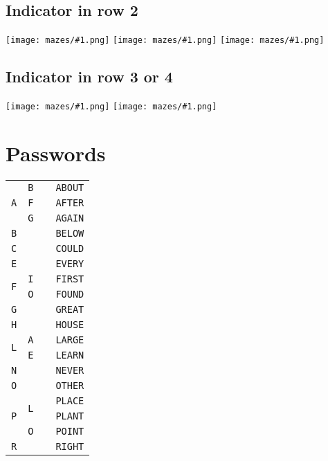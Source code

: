 \documentclass[11pt]{amsart}
\newcommand{\Maze}[1]{\texttt{[image: mazes/\#1.png]}}
\begin{document}
\subsection{Indicator in row 2}
\Maze{21} \Maze{23} \Maze{25}

\subsection{Indicator in row 3 or 4}
\Maze{35} \Maze{44}




\section{Passwords}

\begin{tabular}{|ccc|c|}
\hline
\multirow{3}{*}{\texttt{A}} & \texttt{B} & & \texttt{ABOUT} \\
\cline{2-4}
                            & \texttt{F} & & \texttt{AFTER} \\
\cline{2-4}
                            & \texttt{G} & & \texttt{AGAIN} \\
\hline
\texttt{B} & & & \texttt{BELOW} \\
\hline
\texttt{C} & & & \texttt{COULD} \\
\hline
\texttt{E} & & & \texttt{EVERY} \\
\hline
\multirow{2}{*}{\texttt{F}} & \texttt{I} & & \texttt{FIRST} \\
\cline{2-4}
                            & \texttt{O} & & \texttt{FOUND} \\
\hline
\texttt{G} & & & \texttt{GREAT} \\
\hline
\texttt{H} & & & \texttt{HOUSE} \\
\hline
\multirow{2}{*}{\texttt{L}} & \texttt{A} & & \texttt{LARGE} \\
\cline{2-4}
                            & \texttt{E} & & \texttt{LEARN} \\
\hline
\texttt{N} & & & \texttt{NEVER} \\
\hline
\texttt{O} & & & \texttt{OTHER} \\
\hline
\multirow{3}{*}{\texttt{P}} & \multirow{2}{*}{\texttt{L}} & & \texttt{PLACE} \\
                            &                             & & \texttt{PLANT} \\
\cline{2-4}
                            & \texttt{O} & & \texttt{POINT} \\
\hline
\texttt{R} & & & \texttt{RIGHT} \\

\end{tabular}
\end{document}
